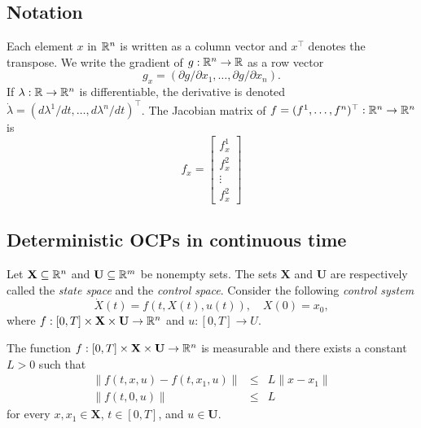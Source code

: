 
\subsection*{Notation} Each element $x$ in $\mathbb{R}^n$ is written as a column vector 
and 
$x^\top$ denotes the transpose. We write the gradient of $g:\mathbb{R}^n\to\mathbb{R}$ as a row 
vector 
    \[ g_x =(\partial g/\partial x_1,\ldots, \partial g/\partial x_n). \]
If $\lambda:\mathbb{R}\to\mathbb{R}^n$ is differentiable, the derivative is denoted 
$\dot{\lambda}=(d\lambda^1/dt,\ldots,d\lambda^n/dt)^\top$. The Jacobian matrix 
of $f=(f^1,\ldots,f^n)^\top:\mathbb{R}^n\to\mathbb{R}^n$ is   
\[f_x=
  \begin{bmatrix}
    f^1_x\\
    f^2_x\\
    \vdots \\
    f^2_x
  \end{bmatrix}
 \]

\subsection{Deterministic OCPs in continuous time}

Let $\mathbf{X}\subseteq\mathbb{R}^n$ and $\mathbf{U}\subseteq \mathbb{R}^m$ be nonempty sets. The sets $\mathbf{X}$ and $\mathbf{U}$ are 
respectively called the {\it state space} and the {\it control space}. Consider 
the following {\it control system}
\begin{equation}\label{CoDiffEq}
\dot{X}(t)=f(t,X(t),u(t)), \quad X(0)=x_0,
\end{equation}
where $f:[0,T]\times \mathbf{X}\times \mathbf{U}\to \mathbb{R}^n$ and $u:[0,T]\to U$. 

\begin{assumption}\label{Assum1}\rm  The function $f:[0,T]\times \mathbf{X}\times \mathbf{U}\to \mathbb{R}^n$
is measurable and there exists a constant $L>0$ such that
\begin{eqnarray}
  \|f(t,x,u)-f(t,x_1,u)\| & \leq & L\|x-x_1\|\label{LipfInx}\\
  \|f(t,0,u)\| & \leq & L\label{fBound}
\end{eqnarray}
for every $x,x_1\in \mathbf{X}$, $t\in[0,T]$, and $u\in \mathbf{U}$.
\end{assumption}

